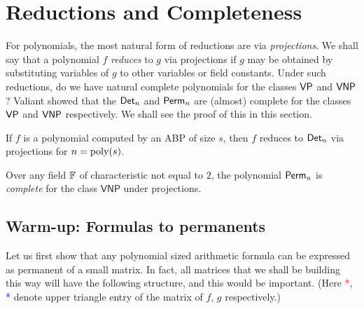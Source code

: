 \chapter{Reductions and Completeness}\label{chap:reduc-complete}

For polynomials, the most natural form of reductions are via \emph{projections}. 
We shall say that a polynomial $f$ \emph{reduces} to $g$ via projections if $g$ may be obtained by substituting variables of $g$ to other variables or field constants. 
Under such reductions, do we have natural complete polynomials for the classes $\mathsf{VP}$ and $\mathsf{VNP}$? 
Valiant \cite{v79} showed that the $\operatorname{\mathsf{Det}}_n$ and $\operatorname{\mathsf{Perm}}_n$ are (almost) complete for the classes $\mathsf{VP}$ and $\mathsf{VNP}$ respectively. 
We shall see the proof of this in this section. 

\begin{theorem}[\cite{v79}]\label{thm:vp}
If $f$ is a polynomial computed by an ABP of size $s$, then $f$ reduces to $\operatorname{\mathsf{Det}}_n$ via projections for $n = \operatorname{poly}(s)$. 
\end{theorem}
\begin{theorem}[\cite{v79}]\label{thm:vnp}
Over any field $\mathbb{F}$ of characteristic not equal to $2$, the polynomial $\operatorname{\mathsf{Perm}}_n$ is \emph{complete} for the class $\mathsf{VNP}$ under projections.
\end{theorem}

\section{Warm-up: Formulas to permanents}\label{sec:formula-to-dets}

Let us first show that any polynomial sized arithmetic formula can be expressed as permanent of a small matrix.
In fact, all matrices that we shall be building this way will have the following structure, and this would be
important. (Here \textcolor{red}{*}, \textcolor{blue}{*} denote upper triangle entry of the matrix of $f$, $g$ respectively.)

\begin{center}
\end{center}

